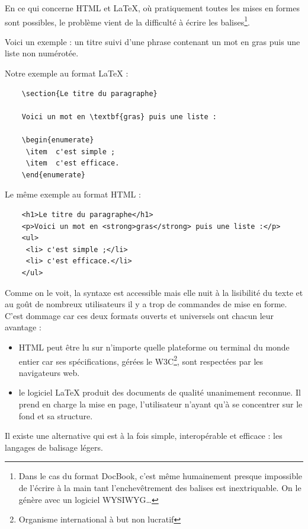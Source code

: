 \documentclass[]{article}
\begin{document}
En ce qui concerne HTML et LaTeX, où pratiquement toutes les mises en
formes sont possibles, le problème vient de la difficulté à écrire les
balises\footnote{Dans le cas du format DocBook, c'est même humainement
  presque impossible de l'écrire à la main tant l'enchevêtrement des
  balises est inextriquable. On le génère avec un logiciel
  WYSIWYG\ldots{}}.

Voici un exemple : un titre suivi d'une phrase contenant un mot en gras
puis une liste non numérotée.

Notre exemple au format LaTeX :

\begin{verbatim}
    \section{Le titre du paragraphe}

    Voici un mot en \textbf{gras} puis une liste :

    \begin{enumerate}
     \item  c'est simple ;
     \item  c'est efficace.
    \end{enumerate}
\end{verbatim}
Le même exemple au format HTML :

\begin{verbatim}
    <h1>Le titre du paragraphe</h1>
    <p>Voici un mot en <strong>gras</strong> puis une liste :</p>
    <ul>
     <li> c'est simple ;</li>
     <li> c'est efficace.</li>
    </ul>
\end{verbatim}
Comme on le voit, la syntaxe est accessible mais elle nuit à la
lisibilité du texte et au goût de nombreux utilisateurs il y a trop de
commandes de mise en forme. C'est dommage car ces deux formats ouverts
et universels ont chacun leur avantage :

\begin{itemize}
\item
  HTML peut être lu sur n'importe quelle plateforme ou terminal du monde
  entier car ses spécifications, gérées le W3C\footnote{Organisme
    international à but non lucratif}, sont respectées par les
  navigateurs web.
\item
  le logiciel LaTeX produit des documents de qualité unanimement
  reconnue. Il prend en charge la mise en page, l'utilisateur n'ayant
  qu'à se concentrer sur le fond et sa structure.
\end{itemize}
Il existe une alternative qui est à la fois simple, interopérable et
efficace : les langages de balisage légers.
\end{document}
